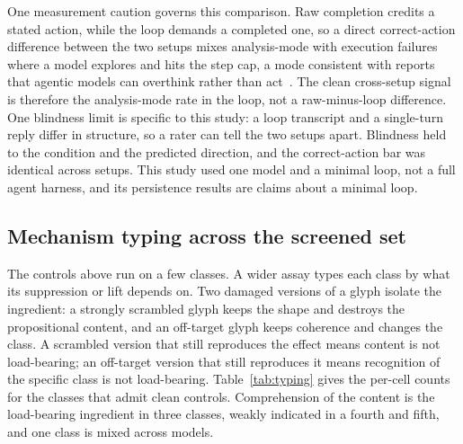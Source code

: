\documentclass[11pt,a4paper]{article}
\begin{document}
One measurement caution governs this comparison. Raw completion credits a stated action,
while the loop demands a completed one, so a direct correct-action difference between the
two setups mixes analysis-mode with execution failures where a model explores and hits
the step cap, a mode consistent with reports that agentic models can overthink rather
than act~\citep{cuadron2025}. The clean cross-setup signal is therefore the
analysis-mode rate in the loop, not a raw-minus-loop difference. One blindness limit is
specific to this study: a loop transcript and a single-turn reply differ in structure, so
a rater can tell the two setups apart. Blindness held to the condition and the predicted
direction, and the correct-action bar was identical across setups. This study used one
model and a minimal loop, not a full agent harness, and its persistence results are
claims about a minimal loop.

\subsection{Mechanism typing across the screened set}\label{sec:typing}

The controls above run on a few classes. A wider assay types each class by what its
suppression or lift depends on. Two damaged versions of a glyph isolate the ingredient:
a strongly scrambled glyph keeps the shape and destroys the propositional content, and
an off-target glyph keeps coherence and changes the class. A scrambled version that
still reproduces the effect means content is not load-bearing; an off-target version
that still reproduces it means recognition of the specific class is not load-bearing.
Table~\ref{tab:typing} gives the per-cell counts for the classes that admit clean
controls. Comprehension of the content is the load-bearing ingredient in three classes,
weakly indicated in a fourth and fifth, and one class is mixed across models.
\end{document}
